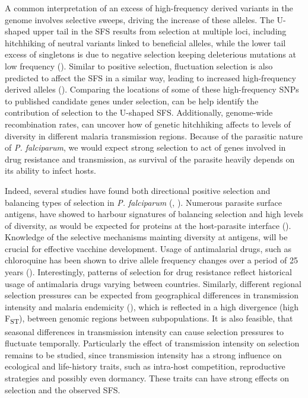\documentclass[11pt]{article}
\begin{document}
A common interpretation of an excess of high-frequency derived variants in the genome involves selective sweeps, driving the increase of these alleles. The U-shaped upper tail in the SFS results from selection at multiple loci, including hitchhiking of neutral variants linked to beneficial alleles, while the lower tail excess of singletons is due to negative selection keeping deleterious mutations at low frequency (\cite{bustamante-2001-direc-selec}). Similar to positive selection, fluctuation selection is also predicted to affect the SFS in a similar way, leading to increased high-frequency derived alleles (\cite{huerta-sanchez-2008-popul-genet}). Comparing the locations of some of these high-frequency SNPs to published candidate genes under selection, can be help identify the contribution of selection to the U-shaped SFS. Additionally, genome-wide recombination rates, can uncover how of genetic hitchhiking affects to levels of diversity in different malaria transmission regions. Because of the parasitic nature of \emph{P. falciparum}, we would expect strong selection to act of genes involved in drug resistance and transmission, as survival of the parasite heavily depends on its ability to infect hosts.

Indeed, several studies have found both directional positive selection and balancing types of selection in \emph{P. falciparum} (\cite{naung-2022-global-diver}, \cite{mobegi-2014-genom-wide}). Numerous parasite surface antigens, have showed to harbour signatures of balancing selection and high levels of diversity, as would be expected for proteins at the host-parasite interface (\cite{naung-2022-global-diver}). Knowledge of the selective mechanisms mainting diversity at antigens, will be crucial for effective vacchine development. Usage of antimalarial drugs, such as chloroquine has been shown to drive allele frequency changes over a period of 25 years (\cite{nwakanma-2013-chang-malar}). Interestingly, patterns of selection for drug resistance reflect historical usage of antimalaria drugs varying between countries. Similarly, different regional selection pressures can be expected from geographical differences in transmission intensity and malaria endemicity (\cite{mobegi-2014-genom-wide}), which is reflected in a high divergence (high F\textsubscript{ST}), between genomic regions between subpopulations. It is also feasible, that seasonal differences in transmission intensity can cause selection pressures to fluctuate temporally. Particularly the effect of transmission intensity on selection remains to be studied, since transmission intensity has a strong influence on ecological and life-history traits, such as intra-host competition, reproductive strategies and possibly even dormancy. These traits can have strong effects on selection and the observed SFS.
\end{document}
